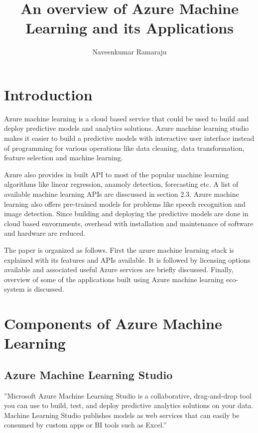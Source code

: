 \documentclass[9pt,twocolumn,twoside]{../../styles/osajnl}
\title{An overview of Azure Machine Learning and its Applications}
\author[1]{Naveenkumar Ramaraju}
\affil[1]{School of Informatics and Computing, Bloomington, IN 47408, U.S.A.}
\affil[*]{Corresponding authors: nramraj@umail.iu.edu}
\begin{document}
\maketitle

\section{Introduction}

Azure machine learning is a cloud based service that could be used to
build and deploy predictive models and analytics solutions. Azure
machine learning studio makes it easier to build a predictive models
with interactive user interface instead of programming for various
operations like data cleaning, data transformation, feature selection
and machine learning.

Azure also provides in built API to most of the popular machine
learning algorithms like linear regression, anamoly detection,
forecasting etc. A list of available machine learning APIs are
disscussed in section 2.3. Azure machine learning also offers
pre-trained models for problems like speech recognition and image
detection. Since building and deploying the predictive
models are done in cloud based envornments, overhead with installation
and maintenance of software and hardware are reduced.  

The paper is organized as follows. First the azure machine learning
stack is explained with its features and APIs available. It is
followed by licensing options available and associated useful Azure
services are briefly discussed. Finally, overview of some of the
applications built using Azure machine learning eco-system is
discussed.



\section{Components of Azure Machine Learning}

\subsection{Azure Machine Learning Studio}

''Microsoft Azure Machine Learning Studio is a collaborative,
drag-and-drop tool you can use to build, test, and deploy predictive
analytics solutions on your data. Machine Learning Studio publishes
models as web services that can easily be consumed by custom apps or
BI tools such as Excel.'' \cite{www-azureMLStudioSite} 
\end{document}
